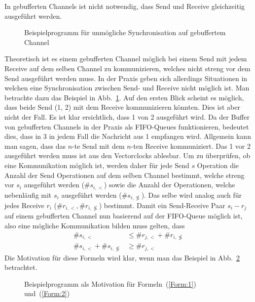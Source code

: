 In gebufferten Channels ist nicht notwendig, dass Send und Receive gleichzeitig
ausgeführt werden.
\begin{figure}[h!]
  \centering
  
  \caption{Beispielprogramm für unmögliche Synchronisation auf gebuffertem Channel}
  \label{Chap:Analyze-Sec:Channel-SubSec:Dangling-Fig:BufferedNoSync}
\end{figure}
Theoretisch ist es einem gebufferten Channel möglich bei einem Send mit 
jedem Receive auf dem selben Channel zu kommunizieren, welches nicht 
streng vor dem Send ausgeführt werden muss. In der Praxis geben sich allerdings 
Situationen in welchen eine Synchronisation zwischen Send- und Receive nicht 
möglich ist. Man betrachte dazu das Beispiel in 
Abb.~\ref{Chap:Analyze-Sec:Channel-SubSec:Dangling-Fig:BufferedNoSync}.
Auf den ersten Blick scheint es möglich, dass beide Send (1, 2) mit dem 
Receive kommunizieren könnten. Dies ist aber nicht der Fall.
Es ist klar ersichtlich, dass 1 von 2 ausgeführt wird. Da der Buffer von 
gebufferten Channels in der Praxis als FIFO-Queues funktionieren, 
bedeutet dies, dass in 3 in jedem Fall die Nachricht aus 1 empfangen wird.
Allgemein kann man sagen, dass das $n$-te Send mit dem $n$-ten Receive 
kommuniziert. 
Das 1 vor 2 ausgeführt 
werden muss ist aus den Vectorclocks ablesbar. Um zu überprüfen, 
ob eine Kommunikation möglich ist, werden daher für jede Send $s$ Operation 
die Anzahl der Send Operationen auf dem selben Channel bestimmt, welche streng vor $s_i$ 
ausgeführt werden ($\#s_{i, <}$) sowie die Anzahl der Operationen, welche nebenläufig mit $s_i$ 
ausgeführt werden ($\#s_{i, \not\lessgtr}$). Das selbe wird analog auch 
für jedes Receive $r_i$ ($\#r_{i, <}, \#r_{i, \not\lessgtr}$) bestimmt. 
Damit ein Send-Receive Paar $s_i - r_j$ auf 
einem gebufferten Channel nun basierend auf der FIFO-Queue möglich ist, 
also eine mögliche Kommunikation bilden muss gelten, dass 
\begin{align}
  \#s_{i, <} &\leq \#r_{j, <} + \#r_{i, \not\lessgtr}\label{Form:1}\\
  \#s_{i, <} + \#s_{i, \not\lessgtr} &\geq \#r_{j, <}\label{Form:2}
\end{align}
Die Motivation für diese Formeln wird klar, wenn man das Beispiel in 
Abb.~\ref{Chap:Analyze-Sec:Channel-SubSec:Dangling-Fig:BufferForm} betrachtet.
\begin{figure}[h!]
  \centering
  
  \caption{Beispielprogramm als Motivation für Formeln~(\ref{Form:1}) und~(\ref{Form:2})}
  \label{Chap:Analyze-Sec:Channel-SubSec:Dangling-Fig:BufferForm}
\end{figure}
